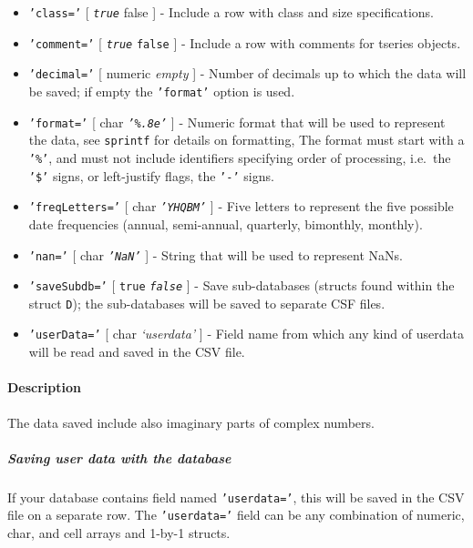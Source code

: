 \begin{itemize}
\item
  \texttt{'class='} {[} \emph{\texttt{true}} \textbar{} false {]} -
  Include a row with class and size specifications.
\item
  \texttt{'comment='} {[} \emph{\texttt{true}} \textbar{} \texttt{false}
  {]} - Include a row with comments for tseries objects.
\item
  \texttt{'decimal='} {[} numeric \textbar{} \emph{empty} {]} - Number
  of decimals up to which the data will be saved; if empty the
  \texttt{'format'} option is used.
\item
  \texttt{'format='} {[} char \textbar{} \emph{\texttt{'\%.8e'}} {]} -
  Numeric format that will be used to represent the data, see
  \texttt{sprintf} for details on formatting, The format must start with
  a \texttt{'\%'}, and must not include identifiers specifying order of
  processing, i.e.~the \texttt{'\$'} signs, or left-justify flags, the
  \texttt{'-'} signs.
\item
  \texttt{'freqLetters='} {[} char \textbar{} \emph{\texttt{'YHQBM'}}
  {]} - Five letters to represent the five possible date frequencies
  (annual, semi-annual, quarterly, bimonthly, monthly).
\item
  \texttt{'nan='} {[} char \textbar{} \emph{\texttt{'NaN'}} {]} - String
  that will be used to represent NaNs.
\item
  \texttt{'saveSubdb='} {[} \texttt{true} \textbar{}
  \emph{\texttt{false}} {]} - Save sub-databases (structs found within
  the struct \texttt{D}); the sub-databases will be saved to separate
  CSF files.
\item
  \texttt{'userData='} {[} char \textbar{} \emph{`userdata'} {]} - Field
  name from which any kind of userdata will be read and saved in the CSV
  file.
\end{itemize}

\paragraph{Description}\label{description}

The data saved include also imaginary parts of complex numbers.

\subparagraph{Saving user data with the
database}\label{saving-user-data-with-the-database}

If your database contains field named \texttt{'userdata='}, this will be
saved in the CSV file on a separate row. The \texttt{'userdata='} field
can be any combination of numeric, char, and cell arrays and 1-by-1
structs.

